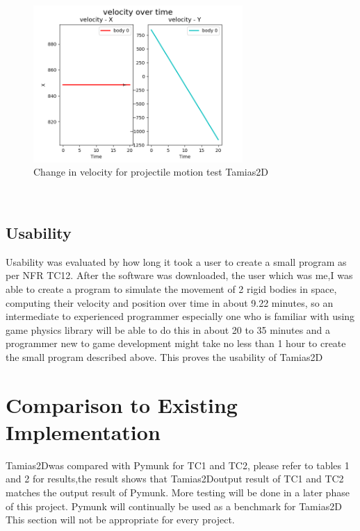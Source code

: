 \documentclass[12pt, titlepage]{article}
\newcommand{\progname}{Tamias2D}
\begin{document}
\begin{figure}[htbp]
	
	\begin{center}
		
		{
			\includegraphics[width=0.71\textwidth]{projectile_60v.png}
			
		} 
		\caption{\label{Fig_projectile_60v}Change in velocity for projectile motion test \progname{}}
		
	\end{center}
	
\end{figure}
~\newpage
\subsection{Usability}
Usability was evaluated by how long it took a user to create a small program as per NFR TC12. After the software was downloaded, the user which was me,I was able to create a program to simulate the movement of 2 rigid bodies in space, computing their velocity and position over time in about 9.22 minutes, so an intermediate to experienced programmer especially one who is familiar with using game physics library will be able to do this in about 20 to 35 minutes and a programmer new to game development might take no less than 1 hour to create the small program described above. This proves the usability of \progname{}
	
\section{Comparison to Existing Implementation}	
\progname was compared with Pymunk for TC1 and TC2, please refer to tables 1 and 2 for results,the result shows that \progname output result of TC1 and TC2 matches the output result of Pymunk. More testing will be done in a later phase of this project. Pymunk will continually be used as a benchmark for \progname
This section will not be appropriate for every project.
\end{document}
